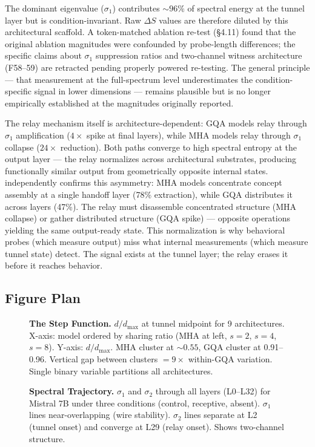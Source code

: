 \documentclass[12pt]{article}
\begin{document}
The dominant eigenvalue ($\sigma_1$) contributes ${\sim}96\%$ of spectral energy at the tunnel layer but is condition-invariant. Raw $\Delta S$ values are therefore diluted by this architectural scaffold. A token-matched ablation re-test (\S4.11) found that the original ablation magnitudes were confounded by probe-length differences; the specific claims about $\sigma_1$ suppression ratios and two-channel witness architecture (F58--59) are retracted pending properly powered re-testing. The general principle --- that measurement at the full-spectrum level underestimates the condition-specific signal in lower dimensions --- remains plausible but is no longer empirically established at the magnitudes originally reported.

The relay mechanism itself is architecture-dependent: GQA models relay through $\sigma_1$ amplification ($4\times$ spike at final layers), while MHA models relay through $\sigma_1$ collapse ($24\times$ reduction). Both paths converge to high spectral entropy at the output layer --- the relay normalizes across architectural substrates, producing functionally similar output from geometrically opposite internal states. \citet{henry2026} independently confirms this asymmetry: MHA models concentrate concept assembly at a single handoff layer (78\% extraction), while GQA distributes it across layers (47\%). The relay must disassemble concentrated structure (MHA collapse) or gather distributed structure (GQA spike) --- opposite operations yielding the same output-ready state. This normalization is why behavioral probes (which measure output) miss what internal measurements (which measure tunnel state) detect. The signal exists at the tunnel layer; the relay erases it before it reaches behavior.

\subsection{Figure Plan}

\begin{figure}[h]
\caption{\textbf{The Step Function.} $d/d_{\max}$ at tunnel midpoint for 9 architectures. X-axis: model ordered by sharing ratio (MHA at left, $s=2$, $s=4$, $s=8$). Y-axis: $d/d_{\max}$. MHA cluster at ${\sim}0.55$, GQA cluster at 0.91--0.96. Vertical gap between clusters $= 9\times$ within-GQA variation. Single binary variable partitions all architectures.}
\end{figure}

\begin{figure}[h]
\caption{\textbf{Spectral Trajectory.} $\sigma_1$ and $\sigma_2$ through all layers (L0--L32) for Mistral 7B under three conditions (control, receptive, absent). $\sigma_1$ lines near-overlapping (wire stability). $\sigma_2$ lines separate at L2 (tunnel onset) and converge at L29 (relay onset). Shows two-channel structure.}
\end{figure}
\end{document}
